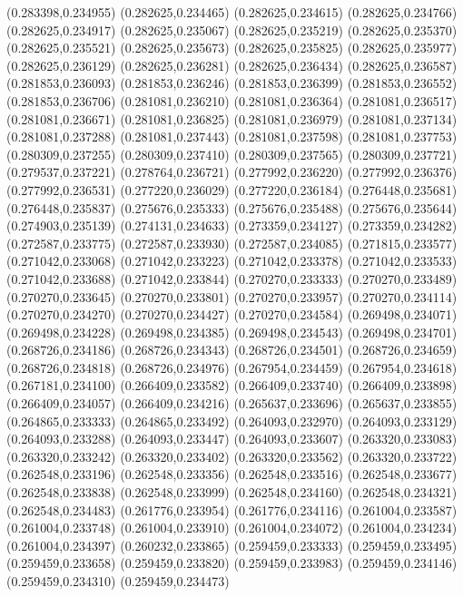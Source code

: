 (0.283398,0.234955)
(0.282625,0.234465)
(0.282625,0.234615)
(0.282625,0.234766)
(0.282625,0.234917)
(0.282625,0.235067)
(0.282625,0.235219)
(0.282625,0.235370)
(0.282625,0.235521)
(0.282625,0.235673)
(0.282625,0.235825)
(0.282625,0.235977)
(0.282625,0.236129)
(0.282625,0.236281)
(0.282625,0.236434)
(0.282625,0.236587)
(0.281853,0.236093)
(0.281853,0.236246)
(0.281853,0.236399)
(0.281853,0.236552)
(0.281853,0.236706)
(0.281081,0.236210)
(0.281081,0.236364)
(0.281081,0.236517)
(0.281081,0.236671)
(0.281081,0.236825)
(0.281081,0.236979)
(0.281081,0.237134)
(0.281081,0.237288)
(0.281081,0.237443)
(0.281081,0.237598)
(0.281081,0.237753)
(0.280309,0.237255)
(0.280309,0.237410)
(0.280309,0.237565)
(0.280309,0.237721)
(0.279537,0.237221)
(0.278764,0.236721)
(0.277992,0.236220)
(0.277992,0.236376)
(0.277992,0.236531)
(0.277220,0.236029)
(0.277220,0.236184)
(0.276448,0.235681)
(0.276448,0.235837)
(0.275676,0.235333)
(0.275676,0.235488)
(0.275676,0.235644)
(0.274903,0.235139)
(0.274131,0.234633)
(0.273359,0.234127)
(0.273359,0.234282)
(0.272587,0.233775)
(0.272587,0.233930)
(0.272587,0.234085)
(0.271815,0.233577)
(0.271042,0.233068)
(0.271042,0.233223)
(0.271042,0.233378)
(0.271042,0.233533)
(0.271042,0.233688)
(0.271042,0.233844)
(0.270270,0.233333)
(0.270270,0.233489)
(0.270270,0.233645)
(0.270270,0.233801)
(0.270270,0.233957)
(0.270270,0.234114)
(0.270270,0.234270)
(0.270270,0.234427)
(0.270270,0.234584)
(0.269498,0.234071)
(0.269498,0.234228)
(0.269498,0.234385)
(0.269498,0.234543)
(0.269498,0.234701)
(0.268726,0.234186)
(0.268726,0.234343)
(0.268726,0.234501)
(0.268726,0.234659)
(0.268726,0.234818)
(0.268726,0.234976)
(0.267954,0.234459)
(0.267954,0.234618)
(0.267181,0.234100)
(0.266409,0.233582)
(0.266409,0.233740)
(0.266409,0.233898)
(0.266409,0.234057)
(0.266409,0.234216)
(0.265637,0.233696)
(0.265637,0.233855)
(0.264865,0.233333)
(0.264865,0.233492)
(0.264093,0.232970)
(0.264093,0.233129)
(0.264093,0.233288)
(0.264093,0.233447)
(0.264093,0.233607)
(0.263320,0.233083)
(0.263320,0.233242)
(0.263320,0.233402)
(0.263320,0.233562)
(0.263320,0.233722)
(0.262548,0.233196)
(0.262548,0.233356)
(0.262548,0.233516)
(0.262548,0.233677)
(0.262548,0.233838)
(0.262548,0.233999)
(0.262548,0.234160)
(0.262548,0.234321)
(0.262548,0.234483)
(0.261776,0.233954)
(0.261776,0.234116)
(0.261004,0.233587)
(0.261004,0.233748)
(0.261004,0.233910)
(0.261004,0.234072)
(0.261004,0.234234)
(0.261004,0.234397)
(0.260232,0.233865)
(0.259459,0.233333)
(0.259459,0.233495)
(0.259459,0.233658)
(0.259459,0.233820)
(0.259459,0.233983)
(0.259459,0.234146)
(0.259459,0.234310)
(0.259459,0.234473)
